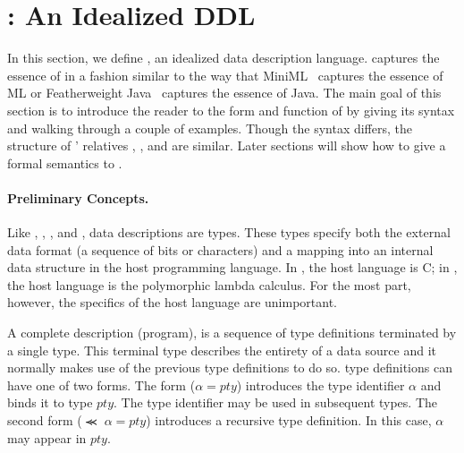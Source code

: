 \section{\ipads{}:  An Idealized DDL}
\label{sec:ipads}

In this section, we define \ipads{}, an idealized data description
language.  \ipads{} captures the essence of \pads{} in a fashion 
similar to the way that MiniML~\cite{miniml} captures the essence of ML or Featherweight 
Java~\cite{igarasi+:featherweight} captures the essence of Java.  The main goal of this section is to introduce
the reader to the form and function of \ipads{} by giving its syntax
and walking through a couple of examples.  Though the syntax differs,
the structure of \pads{}' relatives \blt, \packettypes, and
\datascript{} are similar.  Later sections will show how to give a
formal semantics to \ipads.

\paragraph*{Preliminary Concepts.}
Like \pads, \packettypes, \datascript, and \blt,
\ipads{} data descriptions are types.  These types
specify both the external data format (a sequence of bits or characters)
and a mapping into an internal data structure 
in the host programming language.  In \pads, the host language is
C; in \ipads, the host language is the polymorphic lambda 
calculus.  For the most part, however, the specifics of the
host language are unimportant.  

A complete \ipads{} description (program), is a sequence of type definitions
terminated by a single type.  This terminal type describes the
entirety of a data source and it normally makes use of the previous 
type definitions to do so.  \ipads{} type definitions can have one of
two forms.  The form ($\alpha = pty$) introduces the type identifier
$\alpha$ and binds it to \ipads{} type $pty$.
The type identifier may be used in
subsequent types.  The second form  ($\Prec{}\; \alpha = pty$) introduces
a recursive type definition.  In this case, $\alpha$ may appear in $pty$.


